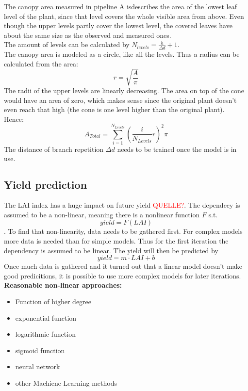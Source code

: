 The canopy area measured in pipeline A isdescribes the area of the lowest leaf level of the plant, since that level covers the whole visible area from above. Even though the upper levels partly cover the lowest level, the covered leaves have about the same size as the observed and measured ones.\\
The amount of levels can be calculated by $N_{levels} = \frac{h}{\Delta d}+1$.\\ 
The canopy area is modeled as a circle, like all the levels. Thus a radius can be calculated from the area:
$$r = \sqrt{\frac{A}{\pi}}$$
The radii of the upper levels are linearly decreasing. The area on top of the cone would have an area of zero, which makes sense since the original plant doesn't even reach that high (the cone is one level higher than the original plant).\\ Hence:
$$A_{Total} = \sum_{i=1}^{N_{Levels}}(\frac{i}{N_{Levels}}r)^2\pi$$
The distance of branch repetition $\Delta d$ needs to be trained once the model is in use.
\subsection{Yield prediction}

\label{section:yieldPrediction}
The LAI index has a huge impact on future yield \textcolor{red}{QUELLE?}. The dependecy is assumed to be a non-linear, meaning there is a nonlinear function $F$ s.t. $$yield = F(LAI)$$. To find that non-linearity, data needs to be gathered first. For complex models more data is needed than for simple models. Thus for the first iteration the dependency is assumed to be linear. The yield will then be predicted by
$$yield = m\cdot LAI + b$$
Once much data is gathered and it turned out that a linear model doesn't make good predicitions, it is possible to use more complex models for later iterations.\\
\textbf{Reasonable non-linear approaches:}
\begin{itemize}
   \item Function of higher degree
   \item exponential function
   \item logarithmic function
   \item sigmoid function
   \item neural network
   \item other Machiene Learning methods
\end{itemize}
